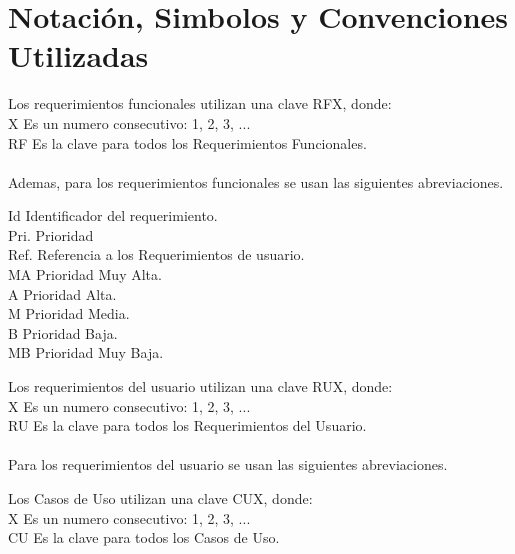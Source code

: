 \section{Notación, Simbolos y Convenciones Utilizadas}
Los requerimientos funcionales utilizan una clave RFX, donde:\\
X Es un numero consecutivo: 1, 2, 3, ... \\
RF Es la clave para todos los Requerimientos Funcionales.\\\\
Ademas, para los requerimientos funcionales se usan las siguientes abreviaciones.\\
\begin{center}
Id Identificador del requerimiento.\\
Pri. Prioridad\\
Ref. Referencia a los Requerimientos de usuario.\\
MA Prioridad Muy Alta.\\
A Prioridad Alta.\\
M Prioridad Media.\\
B Prioridad Baja.\\
MB Prioridad Muy Baja.\\
\end{center}
Los requerimientos del usuario utilizan una clave RUX, donde:\\
X Es un numero consecutivo: 1, 2, 3, ...\\
RU Es la clave para todos los Requerimientos del Usuario.\\\\
Para los requerimientos del usuario se usan las siguientes abreviaciones.\\
\begin{center}
Los Casos de Uso utilizan una clave CUX, donde:\\
X Es un numero consecutivo: 1, 2, 3, ... \\
CU Es la clave para todos los Casos de Uso.\\
\end{center}
